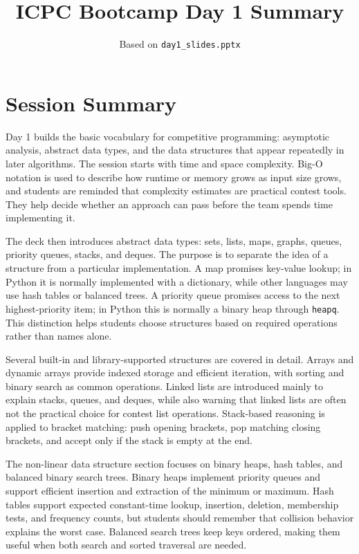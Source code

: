 \documentclass[11pt]{article}
\title{ICPC Bootcamp Day 1 Summary}
\author{Based on \texttt{day1\_slides.pptx}}
\date{}
\begin{document}
\maketitle

\section*{Session Summary}
Day 1 builds the basic vocabulary for competitive programming: asymptotic analysis, abstract data types, and the data structures that appear repeatedly in later algorithms. The session starts with time and space complexity. Big-O notation is used to describe how runtime or memory grows as input size grows, and students are reminded that complexity estimates are practical contest tools. They help decide whether an approach can pass before the team spends time implementing it.

The deck then introduces abstract data types: sets, lists, maps, graphs, queues, priority queues, stacks, and deques. The purpose is to separate the idea of a structure from a particular implementation. A map promises key-value lookup; in Python it is normally implemented with a dictionary, while other languages may use hash tables or balanced trees. A priority queue promises access to the next highest-priority item; in Python this is normally a binary heap through \texttt{heapq}. This distinction helps students choose structures based on required operations rather than names alone.

Several built-in and library-supported structures are covered in detail. Arrays and dynamic arrays provide indexed storage and efficient iteration, with sorting and binary search as common operations. Linked lists are introduced mainly to explain stacks, queues, and deques, while also warning that linked lists are often not the practical choice for contest list operations. Stack-based reasoning is applied to bracket matching: push opening brackets, pop matching closing brackets, and accept only if the stack is empty at the end.

The non-linear data structure section focuses on binary heaps, hash tables, and balanced binary search trees. Binary heaps implement priority queues and support efficient insertion and extraction of the minimum or maximum. Hash tables support expected constant-time lookup, insertion, deletion, membership tests, and frequency counts, but students should remember that collision behavior explains the worst case. Balanced search trees keep keys ordered, making them useful when both search and sorted traversal are needed.
\end{document}
